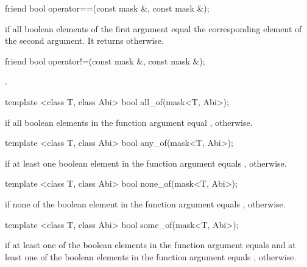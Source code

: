 \begin{itemdecl}
friend bool operator==(const mask &, const mask &);
\end{itemdecl}
\begin{itemdescr}
  \pnum\returns \true if all boolean elements of the first argument equal the corresponding element of the second argument.
  It returns \false otherwise.
\end{itemdescr}

\begin{itemdecl}
friend bool operator!=(const mask &, const mask &);
\end{itemdecl}
\begin{itemdescr}
  \pnum\returns {}.
\end{itemdescr}

\begin{itemdecl}
template <class T, class Abi> bool  all_of(mask<T, Abi>);
\end{itemdecl}
\begin{itemdescr}
  \pnum\returns \true if all boolean elements in the function argument equal \true, \false otherwise.
\end{itemdescr}

\begin{itemdecl}
template <class T, class Abi> bool  any_of(mask<T, Abi>);
\end{itemdecl}
\begin{itemdescr}
  \pnum\returns \true if at least one boolean element in the function argument equals \true, \false otherwise.
\end{itemdescr}

\begin{itemdecl}
template <class T, class Abi> bool none_of(mask<T, Abi>);
\end{itemdecl}
\begin{itemdescr}
  \pnum\returns \true if none of the boolean element in the function argument equals \true, \false otherwise.
\end{itemdescr}

\begin{itemdecl}
template <class T, class Abi> bool some_of(mask<T, Abi>);
\end{itemdecl}
\begin{itemdescr}
  \pnum\returns \true if at least one of the boolean elements in the function argument equals \true and at least one of the boolean elements in the function argument equals \false, \false otherwise.
\end{itemdescr}

